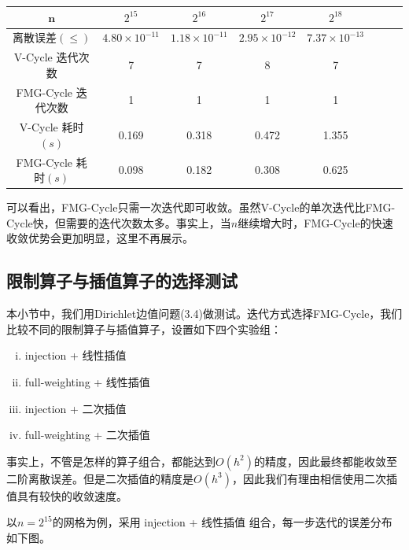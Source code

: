 \documentclass[lang=cn,10pt]{elegantbook}
\begin{document}
\begin{table}[H]
  \centering
  \small
  \begin{tabular}{c|ccccccc}
   $\mathbf{n}$      & $2^{15}$                   & $2^{16}$                   & $2^{17}$                  & $2^{18}$                    \\ \hline
离散误差$(\leq)$   & $4.80\times 10^{-11}$ & $1.18\times 10^{-11}$ & $2.95\times 10^{-12}$ & $7.37\times 10^{-13}$ \\
V-Cycle 迭代次数   & 7 & 7 & 8 & 7 \\
FMG-Cycle 迭代次数   & 1 & 1 & 1 & 1 \\
V-Cycle 耗时$(s)$  & 0.169 & 0.318 & 0.472 & 1.355 \\
FMG-Cycle 耗时$(s)$ & 0.098 & 0.182 & 0.308 & 0.625 
\end{tabular}
\end{table}

可以看出，FMG-Cycle只需一次迭代即可收敛。虽然V-Cycle的单次迭代比FMG-Cycle快，但需要的迭代次数太多。事实上，当$n$继续增大时，FMG-Cycle的快速收敛优势会更加明显，这里不再展示。

\subsection{限制算子与插值算子的选择测试}

本小节中，我们用Dirichlet边值问题(3.4)做测试。迭代方式选择FMG-Cycle，我们比较不同的限制算子与插值算子，设置如下四个实验组：
\begin{enumerate}[(i)]
  \item injection + 线性插值
  \item full-weighting + 线性插值
  \item injection + 二次插值
  \item full-weighting + 二次插值
\end{enumerate}

事实上，不管是怎样的算子组合，都能达到$O(h^2)$的精度，因此最终都能收敛至二阶离散误差。但是二次插值的精度是$O(h^3)$，因此我们有理由相信使用二次插值具有较快的收敛速度。

以$n=2^{15}$的网格为例，采用 injection + 线性插值 组合，每一步迭代的误差分布如下图。
\end{document}
